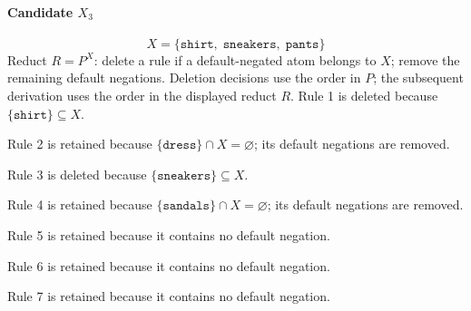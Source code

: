 \documentclass[a4paper,11pt]{article}
\newcommand{\at}[1]{\texttt{#1}}
\begin{document}
\paragraph{Candidate $X_3$}
\[
X=\{\at{shirt},\;\at{sneakers},\;\at{pants}\}
\]
Reduct $R=P^X$: delete a rule if a default-negated atom belongs to $X$; remove the remaining default negations. Deletion decisions use the order in $P$; the subsequent derivation uses the order in the displayed reduct $R$.
Rule 1 is deleted because $\{\at{shirt}\}\subseteq X$.

Rule 2 is retained because $\{\at{dress}\}\cap X=\varnothing$; its default negations are removed.

Rule 3 is deleted because $\{\at{sneakers}\}\subseteq X$.

Rule 4 is retained because $\{\at{sandals}\}\cap X=\varnothing$; its default negations are removed.

Rule 5 is retained because it contains no default negation.

Rule 6 is retained because it contains no default negation.

Rule 7 is retained because it contains no default negation.
\end{document}
